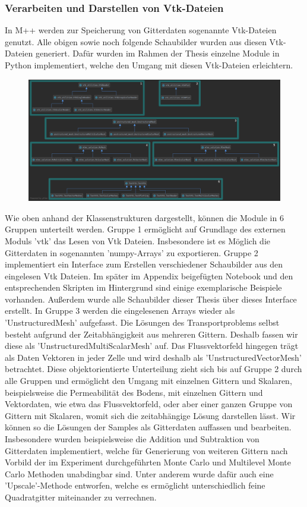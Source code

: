 \subsubsection{Verarbeiten und Darstellen von Vtk-Dateien}
In M++ werden zur Speicherung von Gitterdaten sogenannte Vtk-Dateien genutzt. Alle obigen sowie noch folgende Schaubilder wurden aus diesen Vtk-Dateien generiert. Dafür wurden im Rahmen der Thesis einzelne Module in Python implementiert, welche den Umgang mit diesen Vtk-Dateien erleichtern. 
\begin{figure}[H]
	\centering
	\includegraphics[width=\textwidth]{plots/klassenuml2.png} 
\end{figure}
Wie oben anhand der Klassenstrukturen dargestellt, können die Module in 6 Gruppen unterteilt werden. Gruppe 1 ermöglicht auf Grundlage des externen Moduls 'vtk' \cite{sitevtk} das Lesen von Vtk Dateien. Insbesondere ist es Möglich die Gitterdaten in sogenannten 'numpy-Arrays' zu exportieren. 
Gruppe 2 implementiert ein Interface zum Erstellen verschiedener Schaubilder aus den eingelesen Vtk Dateien. Im später im Appendix beigefügten Notebook und den entsprechenden Skripten im Hintergrund sind einige exemplarische Beispiele vorhanden. Außerdem wurde alle Schaubilder dieser Thesis über dieses Interface erstellt.
In Gruppe 3 werden die eingelesenen Arrays wieder als 'UnstructuredMesh' aufgefasst. Die Lösungen des Transportproblems selbst besteht aufgrund der Zeitabhängigkeit aus mehreren Gittern. Deshalb fassen wir diese als 'UnstructuredMultiScalarMesh' auf. Das Flussvektorfeld hingegen trägt als Daten Vektoren in jeder Zelle und wird deshalb als 'UnstructuredVectorMesh' betrachtet. Diese objektorientierte Unterteilung zieht sich bis auf Gruppe 2 durch alle Gruppen und ermöglicht den Umgang mit einzelnen Gittern und Skalaren, beispielsweise die Permeabilität des Bodens, mit einzelnen Gittern und Vektordaten, wie etwa das Flussvektorfeld, oder aber einer ganzen Gruppe von Gittern mit Skalaren, womit sich die zeitabhängige Lösung darstellen lässt. Wir können so die Lösungen der Samples als Gitterdaten auffassen und bearbeiten. Insbesondere wurden beispielsweise die Addition und Subtraktion von Gitterdaten implementiert, welche für Generierung von weiteren Gittern nach Vorbild der im Experiment durchgeführten Monte Carlo und Multilevel Monte Carlo Methoden unabdingbar sind. Unter anderem wurde dafür auch eine 'Upscale'-Methode entworfen, welche es ermöglicht unterschiedlich feine Quadratgitter miteinander zu verrechnen.
